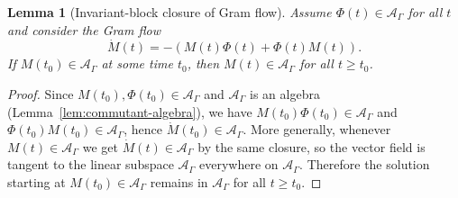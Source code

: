 \documentclass{article}
\theoremstyle{plain}
\newtheorem{lemma}{Lemma}[section]
\numberwithin{equation}{section}
\theoremstyle{definition}
\theoremstyle{remark}
\begin{document}
\begin{lemmaproofbox}
\begin{lemma}[Invariant-block closure of Gram flow]\label{cor:invariant-block-closure}
Assume $\Phi(t)\in\mathcal{A}_\Gamma$ for all $t$ and consider the Gram flow
\[
\dot M(t)=-(M(t)\Phi(t)+\Phi(t)M(t)).
\]
If $M(t_0)\in\mathcal{A}_\Gamma$ at some time $t_0$, then $M(t)\in\mathcal{A}_\Gamma$ for all $t\ge t_0$.
\end{lemma}
\begin{proof}
Since $M(t_0),\Phi(t_0)\in\mathcal{A}_\Gamma$ and $\mathcal{A}_\Gamma$ is an algebra
(Lemma~\ref{lem:commutant-algebra}), we have $M(t_0)\Phi(t_0)\in\mathcal{A}_\Gamma$ and
$\Phi(t_0)M(t_0)\in\mathcal{A}_\Gamma$, hence $\dot M(t_0)\in\mathcal{A}_\Gamma$.
More generally, whenever $M(t)\in\mathcal{A}_\Gamma$ we get $\dot M(t)\in\mathcal{A}_\Gamma$ by the same closure,
so the vector field is tangent to the linear subspace $\mathcal{A}_\Gamma$ everywhere on $\mathcal{A}_\Gamma$.
Therefore the solution starting at $M(t_0)\in\mathcal{A}_\Gamma$ remains in $\mathcal{A}_\Gamma$ for all $t\ge t_0$.
\end{proof}
\end{lemmaproofbox}
\end{document}
